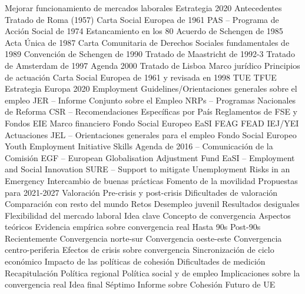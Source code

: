 \documentclass{nuevotema}
\begin{document}
\begin{esquema}[enumerate]
			\3 Mejorar funcionamiento de mercados laborales
			\3 Estrategia 2020
		\2 Antecedentes
			\3 Tratado de Roma (1957)
			\3 Carta Social Europea de 1961
			\3 PAS -- Programa de Acción Social de 1974
			\3 Estancamiento en los 80
			\3 Acuerdo de Schengen de 1985
			\3 Acta Única de 1987
			\3 Carta Comunitaria de Derechos Sociales fundamentales de 1989
			\3 Convención de Schengen de 1990
			\3 Tratado de Maastricht de 1992-3
			\3 Tratado de Amsterdam de 1997
			\3 Agenda 2000
			\3 Tratado de Lisboa
		\2 Marco jurídico
			\3 Principios de actuación
			\3 Carta Social Europea de 1961 y revisada en 1998
			\3 TUE
			\3 TFUE
			\3 Estrategia Europa 2020
			\3 Employment Guidelines/Orientaciones generales sobre el empleo
			\3 JER -- Informe Conjunto sobre el Empleo
			\3 NRPs -- Programas Nacionales de Reforma
			\3 CSR -- Recomendaciones Específicas por País
			\3 Reglamentos de FSE y Fondos EIE
		\2 Marco financiero
			\3 Fondo Social Europeo
			\3 EaSI
			\3 FEAG
			\3 FEAD
			\3 IEJ/YEI
		\2 Actuaciones
			\3 JEL -- Orientaciones generales para el empleo
			\3 Fondo Social Europeo
			\3 Youth Employment Initiative
			\3 Skills Agenda de 2016 -- Comunicación de la Comisión
			\3 EGF -- European Globalisation Adjustment Fund
			\3 EaSI -- Employment and Social Innovation
			\3 SURE -- Support to mitigate Unemployment Risks in an Emergency
			\3 Intercambio de buenas prácticas
			\3 Fomento de la movilidad
			\3 Propuestas para 2021-2027
		\2 Valoración
			\3 Pre-crisis y post-crisis
			\3 Dificultades de valoración
			\3 Comparación con resto del mundo
		\2 Retos
			\3 Desempleo juvenil
			\3 Resultados desiguales
			\3 Flexibilidad del mercado laboral
	\1 
		\2 Idea clave
			\3 Concepto de convergencia
			\3 Aspectos teóricos
		\2 Evidencia empírica sobre convergencia real
			\3 Hasta 90s
			\3 Post-90s
			\3 Recientemente
			\3 Convergencia norte-sur
			\3 Convergencia oeste-este
			\3 Convergencia centro-periferia
			\3 Efectos de crisis sobre convergencia
			\3 Sincronización de ciclo económico
		\2 Impacto de las políticas de cohesión
			\3 Dificultades de medición
	\1[] 
		\2 Recapitulación
			\3 Política regional
			\3 Política social y de empleo
			\3 Implicaciones sobre la convergencia real
		\2 Idea final
			\3 Séptimo Informe sobre Cohesión
			\3 Futuro de UE

\end{esquema}

\esquemalargo
\end{document}
